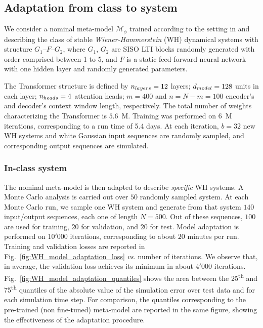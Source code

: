\documentclass{ifacconf}
\newcommand{\free}{\mathcal{M}}
\begin{document}
\subsection{Adaptation from class to system}
We consider a nominal meta-model $ \free_\phi$ trained according to the setting in \citet{forgione2023context} and describing the class of stable \emph{Wiener-Hammerstein} (WH) dynamical systems with structure $G_1$--$F$--$G_2$, where $G_1$, $G_2$ are SISO LTI blocks randomly generated with order comprised between 1 to 5, and $F$ is a static feed-forward neural network with one hidden layer and randomly generated  parameters.
%

The Transformer structure is defined by $n_{\rm layers}=12$
layers;  $d_{\rm model}=128$ units in each layer;  $n_{\rm heads}=4$ attention heads;  $m = 400$ and $n=N-m=100$ encoder's and decoder's context window length, respectively. The total number of weights characterizing the Transformer is $5.6$~M. Training was performed on $6$~M iterations, corresponding to a run time of 5.4 days. At each iteration, $b=32$ new  WH systems and 
 white Gaussian input sequences are  randomly sampled, and corresponding output sequences are simulated.
 


\subsubsection{In-class system}
The nominal meta-model is then adapted to describe \emph{specific} WH systems. A Monte Carlo analysis is carried out over $50$ randomly sampled system. At each Monte Carlo run,  we sample one WH system and generate from that system $140$ input/output sequences, each one of length $N=500$. Out of these sequences, $100$ are used for training, $20$ for validation, and $20$ for test.  Model adaptation is performed on $10'000$ iterations, corresponding to about $20$ minutes per run.  Training and validation losses are reported in Fig.~\ref{fig:WH_model_adaptation_loss} \emph{vs.} number of iterations. We observe that, in average, the validation loss achieves its minimum in about $4'000$ iterations. Fig.~\ref{fig:WH_model_adaptation_quantiles}  shows the area between the 25\textsuperscript{th} and 75\textsuperscript{th} quantiles of the absolute value of the simulation error over test data and for each simulation time step. For comparison, the  quantiles corresponding to the pre-trained (non fine-tuned) meta-model are reported in the same figure, showing the effectiveness of the adaptation procedure. 
\end{document}
